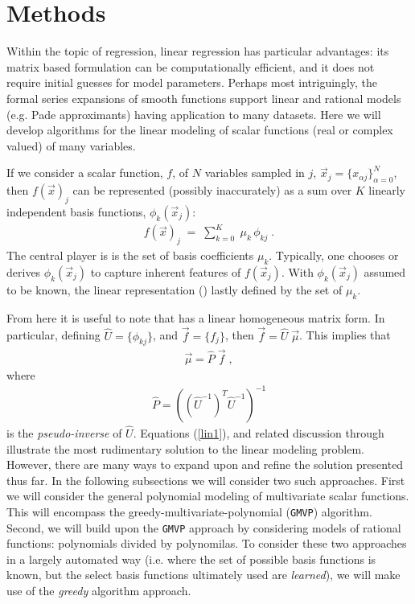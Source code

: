 \documentclass[twocolumn,aps,prd,floatfix,preprintnumbers,a4paper,nofootinbib,
superscriptaddress,10pt]{revtex4-1}
\def\gmvp#1{greedy-multivariate-polynomial#1
  (\texttt{GMVP}#1)\gdef\gmvp{\texttt{GMVP}}}
\begin{document}
\section{Methods}
\label{meth}
%
Within the topic of regression, linear regression has particular advantages:
%
its matrix based formulation can be computationally efficient, and it does not require initial guesses for model parameters.
%
Perhaps most intriguingly, the formal series expansions of smooth functions support linear and rational models (e.g. Pade approximants) having application to many datasets.
%
Here we will develop algorithms for the linear modeling of scalar functions (real or complex valued) of many variables.
%
\par If we consider a scalar function, $f$, of $N$ variables sampled in $j$, $\vec{x}_j = \{x_{\alpha j}\}_{\alpha=0}^{N}$, then $f(\vec{x})_j$ can be represented (possibly inaccurately) as a sum over $K$ linearly independent basis functions, $\phi_k(\vec{x}_j)$:
%
\begin{align}
  \label{lin1}
  f({\vec{x}})_j \; = \; \sum_{k=0}^{K} \; \mu_{k} \, \phi_{kj}\; .
\end{align}
%
The central player is  is the set of basis coefficients $\mu_{k}$.
%
Typically, one chooses or derives $\phi_{k}(\vec{x}_j)$ to capture inherent features of $f(\vec{x}_j)$.
%
With $\phi_{k}(\vec{x}_j)$ assumed to be known, the linear representation () lastly defined by the set of $\mu_k$.
%
\def\vecmu{\vec{\mu}}
\def\vecf{\vec{f}}
\def\hatU{\hat{U}}
\def\hatP{\hat{P}}
%
\par From here it is useful to note that  has a linear homogeneous matrix form.
%
In particular, defining $\hat{U} = \{\phi_{kj}\}$, and $\vec{f} = \{f_j\}$, then $\vec{f} = \hat{U} \; \vec{\mu}$.
%
This implies that
%
\begin{align}
  \label{eq:linsol1}
  \vecmu = \hatP \; \vecf \; ,
\end{align}
%
where
%
\begin{align}
  \label{pinv1}
  \hatP = \left( \left( \hatU^{-1} \right)^T \hatU^{-1} \right)^{-1}
\end{align}
%
is the \textit{pseudo-inverse} \cite{Moore1920,Penrose:1955} of $\hatU$.
%
Equations (\ref{lin1}), and related discussion through  illustrate the most rudimentary solution to the linear modeling problem.
%
However, there are many ways to expand upon and refine the solution presented thus far.
%
In the following subsections we will consider two such approaches.
%
First we will consider the general polynomial modeling of multivariate scalar functions.
%
This will encompass the \gmvp{} algorithm.
%
Second, we will build upon the \gmvp{} approach by considering models of rational functions: polynomials divided by polynomilas.
%
To consider these two approaches in a largely automated way (i.e. where the set of possible basis functions is known, but the select basis functions ultimately used are \textit{learned}), we will make use of the \textit{greedy} algorithm approach.
%
\end{document}
